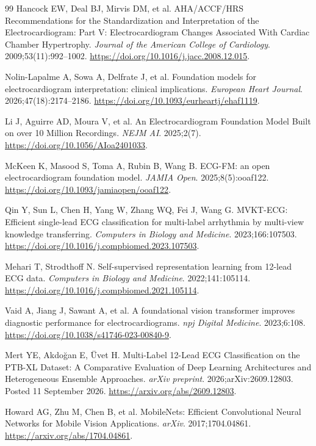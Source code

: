 \documentclass[11pt,a4paper]{article}
\begin{document}
\begin{thebibliography}{99}
 Hancock EW, Deal BJ, Mirvis DM, et al. AHA/ACCF/HRS Recommendations for the Standardization and Interpretation of the Electrocardiogram: Part V: Electrocardiogram Changes Associated With Cardiac Chamber Hypertrophy. \emph{Journal of the American College of Cardiology}. 2009;53(11):992--1002. \url{https://doi.org/10.1016/j.jacc.2008.12.015}.

 Nolin-Lapalme A, Sowa A, Delfrate J, et al. Foundation models for electrocardiogram interpretation: clinical implications. \emph{European Heart Journal}. 2026;47(18):2174--2186. \url{https://doi.org/10.1093/eurheartj/ehaf1119}.

 Li J, Aguirre AD, Moura V, et al. An Electrocardiogram Foundation Model Built on over 10 Million Recordings. \emph{NEJM AI}. 2025;2(7). \url{https://doi.org/10.1056/AIoa2401033}.

 McKeen K, Masood S, Toma A, Rubin B, Wang B. ECG-FM: an open electrocardiogram foundation model. \emph{JAMIA Open}. 2025;8(5):ooaf122. \url{https://doi.org/10.1093/jamiaopen/ooaf122}.

 Qin Y, Sun L, Chen H, Yang W, Zhang WQ, Fei J, Wang G. MVKT-ECG: Efficient single-lead ECG classification for multi-label arrhythmia by multi-view knowledge transferring. \emph{Computers in Biology and Medicine}. 2023;166:107503. \url{https://doi.org/10.1016/j.compbiomed.2023.107503}.

 Mehari T, Strodthoff N. Self-supervised representation learning from 12-lead ECG data. \emph{Computers in Biology and Medicine}. 2022;141:105114. \url{https://doi.org/10.1016/j.compbiomed.2021.105114}.

 Vaid A, Jiang J, Sawant A, et al. A foundational vision transformer improves diagnostic performance for electrocardiograms. \emph{npj Digital Medicine}. 2023;6:108. \url{https://doi.org/10.1038/s41746-023-00840-9}.

 Mert YE, Akdo\u{g}an E, \"{U}vet H. Multi-Label 12-Lead ECG Classification on the PTB-XL Dataset: A Comparative Evaluation of Deep Learning Architectures and Heterogeneous Ensemble Approaches. \emph{arXiv preprint}. 2026;arXiv:2609.12803. Posted 11 September 2026. \url{https://arxiv.org/abs/2609.12803}.

 Howard AG, Zhu M, Chen B, et al. MobileNets: Efficient Convolutional Neural Networks for Mobile Vision Applications. \emph{arXiv}. 2017;1704.04861. \url{https://arxiv.org/abs/1704.04861}.


\end{thebibliography}
\end{document}
